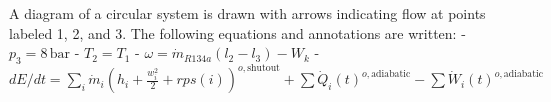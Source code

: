 A diagram of a circular system is drawn with arrows indicating flow at points labeled 1, 2, and 3. The following equations and annotations are written:  
- \( p_3 = 8 \, \text{bar} \)  
- \( T_2 = T_1 \)  
- \( \omega = \dot{m}_{R134a} (l_2 - l_3) - W_{k} \)  
- \( dE/dt = \sum_i \dot{m}_i (h_i + \frac{w_i^2}{2} + rps(i))^{o, \text{shutout}} + \sum \dot{Q}_i(t)^{o, \text{adiabatic}} - \sum \dot{W}_i(t)^{o, \text{adiabatic}} \)